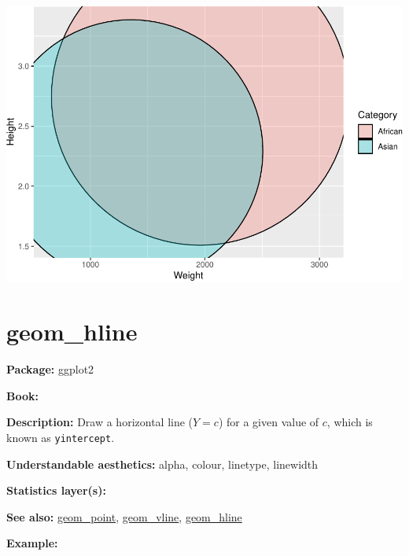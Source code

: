 \documentclass[
]{book}
\begin{document}
\includegraphics{Data-Visualisation-geom-Encyclopedia_files/figure-latex/unnamed-chunk-43-1.pdf}

\hypertarget{hline}{%
\section{geom\_hline}\label{hline}}

\textbf{Package: } ggplot2 \autocite{R-ggplot2}

\textbf{Book: }

\textbf{Description: } Draw a horizontal line (\(Y=c\)) for a given value of \(c\), which is known as \texttt{yintercept}.

\textbf{Understandable aesthetics:} alpha, colour, linetype, linewidth

\textbf{Statistics layer(s):}

\textbf{See also: } \protect\hyperlink{point}{geom\_point}, \protect\hyperlink{vline}{geom\_vline}, \protect\hyperlink{hline}{geom\_hline}

\textbf{Example:}
\end{document}
